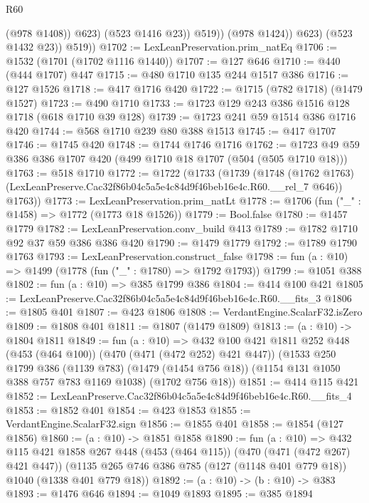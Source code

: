 \begin{lexlean}{R60}
\begin{coremodule}
                        (@978 @1408))
                      @623)
                    (@523 @1416 @23))
                  @519))
              (@978 @1424))
            @623)
          (@523 @1432 @23))
        @519))
@1702 := LexLeanPreservation.prim_natEq
@1706 := @1532 (@1701 (@1702 @1116 @1440))
@1707 := @127 @646
@1710 := @440 (@444 @1707) @447
@1715 := @480 @1710 @135 @244 @1517 @386
@1716 := @127 @1526
@1718 := @417 @1716 @420
@1722 := @1715 (@782 @1718) (@1479 @1527)
@1723 := @490 @1710
@1733 := @1723 @129 @243 @386 @1516 @128 @1718 (@618 @1710 @39 @128)
@1739 := @1723 @241 @59 @1514 @386 @1716 @420
@1744 := @568 @1710 @239 @80 @388 @1513
@1745 := @417 @1707
@1746 := @1745 @420
@1748 := @1744 @1746 @1716
@1762 := @1723 @49 @59 @386 @386 @1707 @420 (@499 @1710 @18 @1707 (@504 (@505 @1710 @18)))
@1763 := @518 @1710
@1772 := @1722
    (@1733
      (@1739
        (@1748 (@1762 @1763) (LexLeanPreserve.Cac32f86b04c5a5e4c84d9f46beb16e4c.R60.__rel_7 @646))
        @1763))
@1773 := LexLeanPreservation.prim_natLt
@1778 := @1706 (fun ("_" : @1458) => @1772 (@1773 @18 @1526))
@1779 := Bool.false
@1780 := @1457 @1779
@1782 := LexLeanPreservation.conv_build @413
@1789 := @1782 @1710 @92 @37 @59 @386 @386 @420
@1790 := @1479 @1779
@1792 := @1789 @1790 @1763
@1793 := LexLeanPreservation.construct_false
@1798 := fun (a : @10) => @1499 (@1778 (fun ("_" : @1780) => @1792 @1793))
@1799 := @1051 @388
@1802 := fun (a : @10) => @385 @1799 @386
@1804 := @414 @100 @421
@1805 := LexLeanPreserve.Cac32f86b04c5a5e4c84d9f46beb16e4c.R60.__fits_3
@1806 := @1805 @401
@1807 := @423 @1806
@1808 := VerdantEngine.ScalarF32.isZero
@1809 := @1808 @401
@1811 := @1807 (@1479 @1809)
@1813 := (a : @10) -> @1804 @1811
@1849 := fun (a : @10) =>
  @432
    @100
    @421
    @1811
    @252
    @448
    (@453 (@464 @100))
    (@470 (@471 (@472 @252) @421 @447))
    (@1533
      @250
      @1799
      @386
      (@1139 @783)
      (@1479 (@1454 @756 @18))
      (@1154 @131 @1050 @388 @757 @783 @1169 @1038)
      (@1702 @756 @18))
@1851 := @414 @115 @421
@1852 := LexLeanPreserve.Cac32f86b04c5a5e4c84d9f46beb16e4c.R60.__fits_4
@1853 := @1852 @401
@1854 := @423 @1853
@1855 := VerdantEngine.ScalarF32.sign
@1856 := @1855 @401
@1858 := @1854 (@127 @1856)
@1860 := (a : @10) -> @1851 @1858
@1890 := fun (a : @10) =>
  @432
    @115
    @421
    @1858
    @267
    @448
    (@453 (@464 @115))
    (@470 (@471 (@472 @267) @421 @447))
    (@1135 @265 @746 @386 @785 (@127 (@1148 @401 @779 @18)) @1040 (@1338 @401 @779 @18))
@1892 := (a : @10) -> (b : @10) -> @383
@1893 := @1476 @646
@1894 := @1049 @1893
@1895 := @385 @1894

\end{coremodule}
\end{lexlean}

